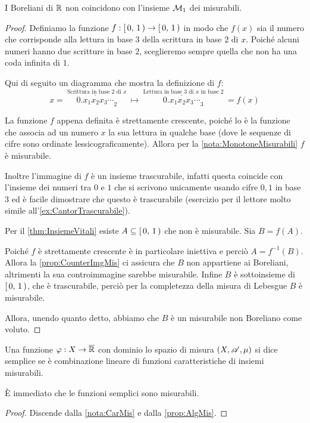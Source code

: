 \begin{proposition}\label{prop:BorelianiNonMisurabili2}
	I Boreliani di $\mathbb R$ non coincidono con l'insieme $\mathcal M_1$ dei misurabili.
\end{proposition}
\begin{proof}
	Definiamo la funzione $f:\left[\,0,\,1\,\right)\to \left[\,0,\,1\,\right)$ in modo che $f(x)$ sia il numero che corrisponde alla lettura in base $3$ della scrittura in base $2$ di $x$.
	Poiché alcuni numeri hanno due scritture in base $2$, sceglieremo sempre quella che non ha una coda infinita di $1$.
	
	Qui di seguito un diagramma che mostra la definizione di $f$:
	\begin{equation*}
		x=\>\stackrel{\text{Scrittura in base $2$ di $x$}}{\overline{0.x_1x_2x_3\cdots}_2} \>  \longmapsto
		\> \stackrel{\text{Lettura in base $3$ di $x$ in base $2$}}{\overline{0.x_1x_2x_3\cdots}_3}\>=f(x)
	\end{equation*}

	La funzione $f$ appena definita è strettamente crescente, poiché lo è la funzione che associa ad un numero $x$ la sua lettura in qualche base (dove le sequenze di cifre sono ordinate lessicograficamente). Allora per la \cref{nota:MonotoneMisurabili} $f$ è misurabile.
	
	Inoltre l'immagine di $f$ è un insieme trascurabile, infatti questa coincide con l'insieme dei numeri tra $0$ e $1$ che si scrivono unicamente usando cifre $0,1$ in base $3$ ed è facile dimostrare che questo è trascurabile (esercizio per il lettore molto simile all'\cref{ex:CantorTrascurabile}).
	
	Per il \cref{thm:InsiemeVitali} esiste $A\subseteq \left[\,0,\,1\,\right)$ che non è misurabile.
	Sia $B=f(A)$.
	
	Poiché $f$ è strettamente crescente è in particolare iniettiva e perciò $A=f^{-1}(B)$.
	Allora la \cref{prop:CounterImgMis} ci assicura che $B$ non appartiene ai Boreliani, altrimenti la sua controimmagine sarebbe misurabile. 
	Infine $B$ è sottoinsieme di $\left[\,0,\,1\,\right)$, che è trascurabile, perciò per la completezza della misura di Lebesgue $B$ è misurabile.
	
	Allora, unendo quanto detto, abbiamo che $B$ è un misurabile non Boreliano come voluto.
\end{proof}



\begin{definition}
	Una funzione $\varphi:X \rightarrow \overline{\mathbb R}$ con dominio lo spazio di misura $(X,\mathscr A,\mu)$ si dice semplice se è combinazione lineare di
	funzioni caratteristiche di insiemi misurabili.
\end{definition}
\begin{remark}
	È immediato che le funzioni semplici sono misurabili.
\end{remark}
\begin{proof}
	Discende dalla \cref{nota:CarMis} e dalla \cref{prop:AlgMis}.
\end{proof}


